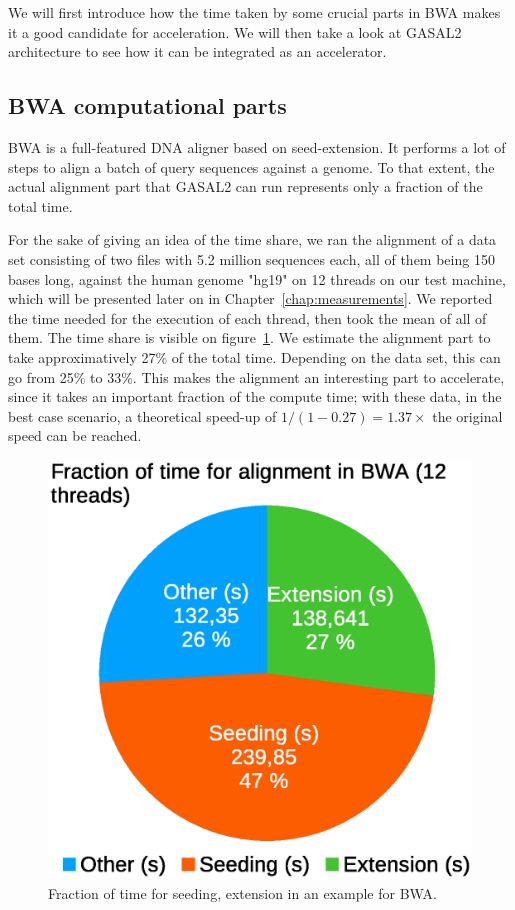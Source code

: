

We will first introduce how the time taken by some crucial parts in BWA makes it a good candidate for acceleration. We will then take a look at GASAL2 architecture to see how it can be integrated as an accelerator.


\subsection{BWA computational parts}

BWA is a full-featured DNA aligner based on seed-extension. It performs a lot of steps to align a batch of query sequences against a genome. To that extent, the actual alignment part that GASAL2 can run represents only a fraction of the total time.

For the sake of giving an idea of the time share, we ran the alignment of a data set consisting of two files with 5.2 million sequences each, all of them being 150 bases long, against the human genome "hg19" on 12 threads on our test machine, which will be presented later on in Chapter~\ref{chap:measurements}. We reported the time needed for the execution of each thread, then took the mean of all of them. The time share is visible on figure~\ref{fig:bwatimedivision}. We estimate the alignment part to take approximatively 27\% of the total time. Depending on the data set, this can go from 25\% to 33\%. This makes the alignment an interesting part to accelerate, since it takes an important fraction of the compute time; with these data, in the best case scenario, a theoretical speed-up of $1/\left(1 - 0.27\right) = 1.37\times$ the original speed can be reached.

\begin{figure}[h!]
	\centering
	\includegraphics[width=0.65\linewidth]{bwa_time_division}
	\caption{Fraction of time for seeding, extension in an example for BWA.}
	\label{fig:bwatimedivision}
\end{figure}


